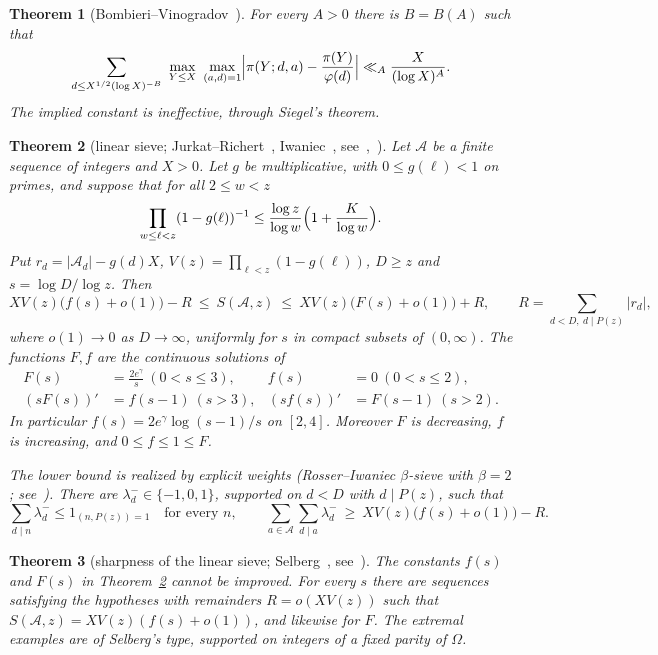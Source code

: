 \documentclass[final,11pt]{elsarticle}
\newtheorem{theorem}{Theorem}[section]
\theoremstyle{definition}
\theoremstyle{remark}
\numberwithin{equation}{section}
\begin{document}
\begin{theorem}[Bombieri--Vinogradov~\cite{Bombieri65,Vinogradov65}]\label{thm:bv}
For every $A>0$ there is $B=B(A)$ such that
\[
\sum_{d\le X^{1/2}(\log X)^{-B}}\ \max_{Y\le X}\ \max_{(a,d)=1}\Bigl|\pi(Y;d,a)-\frac{\pi(Y)}{\varphi(d)}\Bigr|\ll_A \frac{X}{(\log X)^{A}}.
\]
The implied constant is ineffective, through Siegel's theorem.
\end{theorem}


\begin{theorem}[linear sieve; Jurkat--Richert~\cite{JurkatRichert}, Iwaniec~\cite{Iwaniec80}, see~\cite{HR},~\cite{FI}]\label{thm:linear-sieve}
Let $\mathcal A$ be a finite sequence of integers and $X>0$. Let $g$ be multiplicative, with $0\le g(\ell)<1$ on primes, and suppose that for all $2\le w<z$
\[
\prod_{w\le\ell<z}(1-g(\ell))^{-1}\le\frac{\log z}{\log w}\Bigl(1+\frac{K}{\log w}\Bigr).
\]
Put $r_d=|\mathcal A_d|-g(d)X$, $V(z)=\prod_{\ell<z}(1-g(\ell))$, $D\ge z$ and $s=\log D/\log z$. Then
\[
XV(z)\bigl(f(s)+o(1)\bigr)-R\ \le\ S(\mathcal A,z)\ \le\ XV(z)\bigl(F(s)+o(1)\bigr)+R,\qquad R=\sum_{d<D,\ d\mid P(z)}|r_d|,
\]
where $o(1)\to0$ as $D\to\infty$, uniformly for $s$ in compact subsets of $(0,\infty)$. The functions $F,f$ are the continuous solutions of
\[
\begin{aligned} F(s)&=\frac{2e^\gamma}{s}\ (0<s\le3), & f(s)&=0\ (0<s\le2),\\ (sF(s))'&=f(s-1)\ (s>3), &(sf(s))'&=F(s-1)\ (s>2). \end{aligned}
\]
In particular $f(s)=2e^\gamma\log(s-1)/s$ on $[2,4]$. Moreover $F$ is decreasing, $f$ is increasing, and $0\le f\le1\le F$.

The lower bound is realized by explicit weights (Rosser--Iwaniec $\beta$-sieve with $\beta=2$; see~\cite[Ch.~11--12]{FI}). There are $\lambda^-_d\in\{-1,0,1\}$, supported on $d<D$ with $d\mid P(z)$, such that
\[
\sum_{d\mid n}\lambda^-_d\le 1_{(n,P(z))=1}\quad\text{for every }n,
\qquad
\sum_{a\in\mathcal A}\sum_{d\mid a}\lambda^-_d\ \ge\ XV(z)\bigl(f(s)+o(1)\bigr)-R .
\]
\end{theorem}

\begin{theorem}[sharpness of the linear sieve; Selberg~\cite{SelbergLectures}, see~\cite{FI}]\label{thm:sharp}
The constants $f(s)$ and $F(s)$ in Theorem~\ref{thm:linear-sieve} cannot be improved. For every $s$ there are sequences satisfying the hypotheses with remainders $R=o(XV(z))$ such that $S(\mathcal A,z)=XV(z)(f(s)+o(1))$, and likewise for $F$. The extremal examples are of Selberg's type, supported on integers of a fixed parity of $\Omega$.
\end{theorem}
\end{document}
